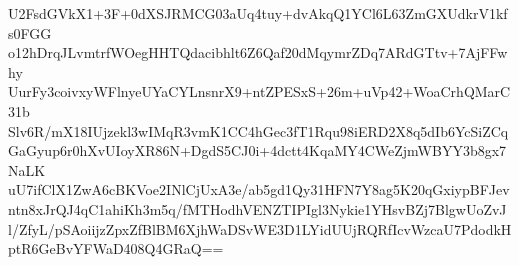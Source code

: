 U2FsdGVkX1+3F+0dXSJRMCG03aUq4tuy+dvAkqQ1YCl6L63ZmGXUdkrV1kfs0FGG
o12hDrqJLvmtrfWOegHHTQdacibhlt6Z6Qaf20dMqymrZDq7ARdGTtv+7AjFFwhy
UurFy3coivxyWFlnyeUYaCYLnsnrX9+ntZPESxS+26m+uVp42+WoaCrhQMarC31b
Slv6R/mX18IUjzekl3wIMqR3vmK1CC4hGec3fT1Rqu98iERD2X8q5dIb6YcSiZCq
GaGyup6r0hXvUIoyXR86N+DgdS5CJ0i+4dctt4KqaMY4CWeZjmWBYY3b8gx7NaLK
uU7ifClX1ZwA6cBKVoe2INlCjUxA3e/ab5gd1Qy31HFN7Y8ag5K20qGxiypBFJev
ntn8xJrQJ4qC1ahiKh3m5q/fMTHodhVENZTIPIgl3Nykie1YHsvBZj7BlgwUoZvJ
l/ZfyL/pSAoiijzZpxZfBlBM6XjhWaDSvWE3D1LYidUUjRQRfIcvWzcaU7PdodkH
ptR6GeBvYFWaD408Q4GRaQ==
